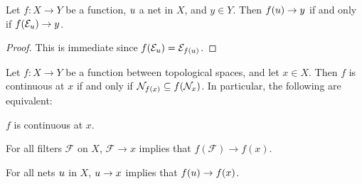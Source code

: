 \documentclass[article, a4paper, 11pt, oneside]{memoir}
\numberwithin{equation}{chapter}
\newcommand{\calF}{\mathcal{F}}
\theoremstyle{nonumberplain}
\begin{document}
\begin{corollary}
    \label{thm:filter-net-convergence}
    Let $f \colon X \to Y$ be a function, $\mynet$ a net in $X$, and $y \in Y$. Then $f(\mynet) \to y$ if and only if $f(\evfilt[\mynet]) \to y$.
\end{corollary}

\begin{proof}
    This is immediate since $f(\evfilt[\mynet]) = \evfilt[f(\mynet)]$.
\end{proof}


\begin{proposition}
    \label{thm:continuity-filter-net}
    Let $f \colon X \to Y$ be a function between topological spaces, and let $x \in X$. Then $f$ is continuous at $x$ if and only if $\nhoods{f(x)} \subseteq f(\nhoods{x})$. In particular, the following are equivalent:
    \begin{enumprop}
        \item \label{enum:continuity-point} $f$ is continuous at $x$.
        \item \label{enum:filter-convergence-point} For all filters $\calF$ on $X$, $\calF \to x$ implies that $f(\calF) \to f(x)$.
        \item \label{enum:net-convergence-point} For all nets $\mynet$ in $X$, $\mynet \to x$ implies that $f(\mynet) \to f(x)$.
    \end{enumprop}
\end{proposition}
\end{document}
